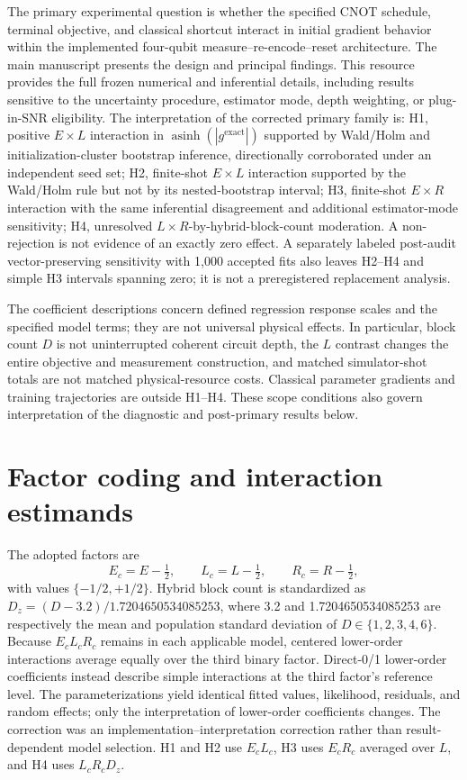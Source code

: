 \documentclass[pdflatex,sn-basic,Numbered]{sn-jnl}
\begin{document}
The primary experimental question is whether the specified CNOT schedule, terminal objective, and classical shortcut interact in initial gradient behavior within the implemented four-qubit measure--re-encode--reset architecture. The main manuscript presents the design and principal findings. This resource provides the full frozen numerical and inferential details, including results sensitive to the uncertainty procedure, estimator mode, depth weighting, or plug-in-SNR eligibility. The interpretation of the corrected primary family is: H1, positive $E\times L$ interaction in $\operatorname{asinh}(|g^{\mathrm{exact}}|)$ supported by Wald/Holm and initialization-cluster bootstrap inference, directionally corroborated under an independent seed set; H2, finite-shot $E\times L$ interaction supported by the Wald/Holm rule but not by its nested-bootstrap interval; H3, finite-shot $E\times R$ interaction with the same inferential disagreement and additional estimator-mode sensitivity; H4, unresolved $L\times R$-by-hybrid-block-count moderation. A non-rejection is not evidence of an exactly zero effect. A separately labeled post-audit vector-preserving sensitivity with 1,000 accepted fits also leaves H2--H4 and simple H3 intervals spanning zero; it is not a preregistered replacement analysis.

The coefficient descriptions concern defined regression response scales and the specified model terms; they are not universal physical effects. In particular, block count $D$ is not uninterrupted coherent circuit depth, the $L$ contrast changes the entire objective and measurement construction, and matched simulator-shot totals are not matched physical-resource costs. Classical parameter gradients and training trajectories are outside H1--H4. These scope conditions also govern interpretation of the diagnostic and post-primary results below.

\section{Factor coding and interaction estimands}

The adopted factors are
\[
E_c=E-\tfrac12,\qquad L_c=L-\tfrac12,\qquad R_c=R-\tfrac12,
\]
with values $\{-1/2,+1/2\}$. Hybrid block count is standardized as $D_z=(D-3.2)/1.7204650534085253$, where 3.2 and 1.7204650534085253 are respectively the mean and population standard deviation of $D\in\{1,2,3,4,6\}$. Because $E_cL_cR_c$ remains in each applicable model, centered lower-order interactions average equally over the third binary factor. Direct-0/1 lower-order coefficients instead describe simple interactions at the third factor's reference level. The parameterizations yield identical fitted values, likelihood, residuals, and random effects; only the interpretation of lower-order coefficients changes. The correction was an implementation--interpretation correction rather than result-dependent model selection. H1 and H2 use $E_cL_c$, H3 uses $E_cR_c$ averaged over $L$, and H4 uses $L_cR_cD_z$.
\end{document}
